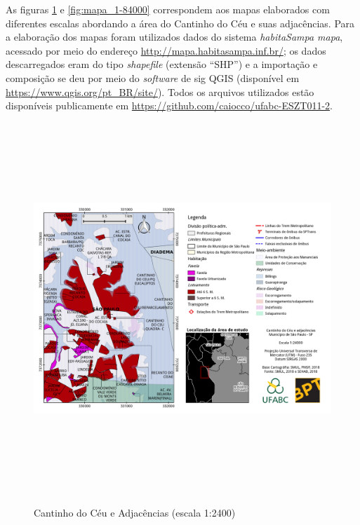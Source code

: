 	As figuras \ref*{fig:mapa_1-24000} e \ref*{fig:mapa_1-84000} correspondem aos mapas elaborados com diferentes escalas abordando a área do Cantinho do Céu e suas adjacências. Para a elaboração dos mapas foram utilizados dados do sistema \textit{habitaSampa mapa}, acessado por meio do endereço \url{http://mapa.habitasampa.inf.br/}; os dados descarregados eram do tipo \textit{shapefile} (extensão ``SHP'') e a importação e composição se deu por meio do \textit{software} de \gls{sig} QGIS (disponível em \url{https://www.qgis.org/pt_BR/site/}). Todos os arquivos utilizados estão disponíveis publicamente em \url{https://github.com/caiocco/ufabc-ESZT011-2}.

	\begin{landscape}
		\begin{figure}
			\centering
			\caption{Cantinho do Céu e Adjacências (escala 1:2400)}
			\includegraphics[height=14cm,keepaspectratio]{img/mapa_1-24000}
			\label{fig:mapa_1-24000}
		\end{figure}
	\end{landscape}
	
